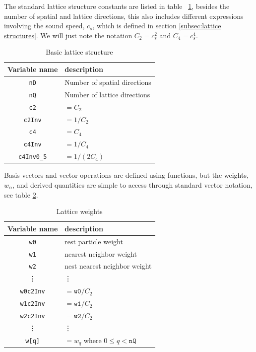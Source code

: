 \documentclass[11pt,a4paper]{report}
\begin{document}
The standard lattice structure constants are listed in table ~\ref{tab:basic lattice structure}, besides the number of spatial and lattice directions, this also includes different expressions involving the sound speed, $c_s$, which is defined in section \ref{subsec:lattice structures}. We will just note the notation $C_2=c_s^2$ and $C_4=c_s^4$.   
\begin{table}
	\centering
	\begin{tabular}{|c|l|}\hline
		Variable name & description \\ \hline
		\texttt{nD} & Number of spatial directions \\ 
		\texttt{nQ} & Number of lattice directions \\ \hline
		\texttt{c2} & $=C_2$ \\ 
		\texttt{c2Inv} & $=1/C_2$ \\ \hline
		\texttt{c4} & $=C_4$ \\ 
		\texttt{c4Inv} & $=1/C_4$ \\ 
		\texttt{c4Inv0{\_}5} & $=1/(2C_4)$ \\ \hline
	\end{tabular}
	\caption{Basic lattice structure}
	\label{tab:basic lattice structure}
\end{table}
Basis vectors and vector operations are defined using functions, but the weights, $w_\alpha$, and derived quantities are simple to access through standard vector notation, see table \ref{tab:lattice weights}.
\begin{table}
	\centering
	\begin{tabular}{|c|l|}\hline
		Variable name & description \\ \hline
		\texttt{w0} & rest particle weight \\ 
		\texttt{w1} & nearest neighbor weight \\ 
		\texttt{w2} & nest nearest neighbor weight \\ 
		\vdots & \vdots \\ \hline
		\texttt{w0c2Inv} & $=\texttt{w0}/C_2$ \\ 
		\texttt{w1c2Inv} & $=\texttt{w1}/C_2$ \\ 
		\texttt{w2c2Inv} & $=\texttt{w2}/C_2$ \\ 
		\vdots & \vdots \\ \hline
		\texttt{w[q]} & $=w_q$ where $0\leq q < \texttt{nQ}$ \\ \hline
	\end{tabular}
	\caption{Lattice weights}
	\label{tab:lattice weights}
\end{table}
\end{document}
